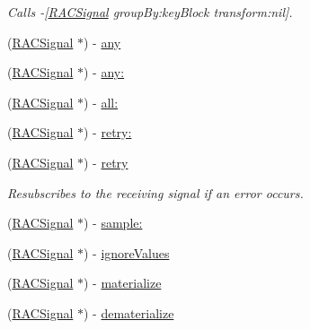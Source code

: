 \begin{DoxyCompactItemize}
\begin{DoxyCompactList}\small\item\em Calls -\/\mbox{[}\mbox{\hyperlink{interface_r_a_c_signal}{R\+A\+C\+Signal}} group\+By\+:key\+Block transform\+:nil\mbox{]}. \end{DoxyCompactList}\item 
(\mbox{\hyperlink{interface_r_a_c_signal}{R\+A\+C\+Signal}} $\ast$) -\/ \mbox{\hyperlink{category_r_a_c_signal_07_operations_08_af64359cf92ab95039f48270a71446e08}{any}}
\item 
(\mbox{\hyperlink{interface_r_a_c_signal}{R\+A\+C\+Signal}} $\ast$) -\/ \mbox{\hyperlink{category_r_a_c_signal_07_operations_08_a4bfb6af6556526457fbf0e5d3c878536}{any\+:}}
\item 
(\mbox{\hyperlink{interface_r_a_c_signal}{R\+A\+C\+Signal}} $\ast$) -\/ \mbox{\hyperlink{category_r_a_c_signal_07_operations_08_adb70e0b813cec0b7bcc5c76f2f3cd88f}{all\+:}}
\item 
(\mbox{\hyperlink{interface_r_a_c_signal}{R\+A\+C\+Signal}} $\ast$) -\/ \mbox{\hyperlink{category_r_a_c_signal_07_operations_08_a3601540c46ceb34dbd1c242782022809}{retry\+:}}
\item 
\mbox{\label{category_r_a_c_signal_07_operations_08_a4fb19910fa59ca689d5f63bbd880e1e8}} 
(\mbox{\hyperlink{interface_r_a_c_signal}{R\+A\+C\+Signal}} $\ast$) -\/ \mbox{\hyperlink{category_r_a_c_signal_07_operations_08_a4fb19910fa59ca689d5f63bbd880e1e8}{retry}}
\begin{DoxyCompactList}\small\item\em Resubscribes to the receiving signal if an error occurs. \end{DoxyCompactList}\item 
(\mbox{\hyperlink{interface_r_a_c_signal}{R\+A\+C\+Signal}} $\ast$) -\/ \mbox{\hyperlink{category_r_a_c_signal_07_operations_08_a556702f113ba65f01fabf8363bd25e46}{sample\+:}}
\item 
(\mbox{\hyperlink{interface_r_a_c_signal}{R\+A\+C\+Signal}} $\ast$) -\/ \mbox{\hyperlink{category_r_a_c_signal_07_operations_08_a2997862d443d16efa3197facb6a354d1}{ignore\+Values}}
\item 
(\mbox{\hyperlink{interface_r_a_c_signal}{R\+A\+C\+Signal}} $\ast$) -\/ \mbox{\hyperlink{category_r_a_c_signal_07_operations_08_a2b970ec1845b139478ba31f00fe34b71}{materialize}}
\item 
(\mbox{\hyperlink{interface_r_a_c_signal}{R\+A\+C\+Signal}} $\ast$) -\/ \mbox{\hyperlink{category_r_a_c_signal_07_operations_08_aa5b197f63d89c698c8cbfc749ea15440}{dematerialize}}

\end{DoxyCompactItemize}
